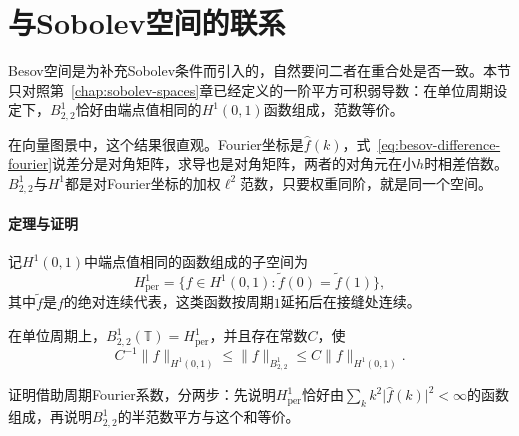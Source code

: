 \section{与Sobolev空间的联系}
\label{sec:besov-sobolev}

Besov空间是为补充Sobolev条件而引入的，自然要问二者在重合处是否一致。本节只对照第~\ref{chap:sobolev-spaces}章已经定义的一阶平方可积弱导数：在单位周期设定下，$B^1_{2,2}$恰好由端点值相同的$H^1(0,1)$函数组成，范数等价。

在向量图景中，这个结果很直观。Fourier坐标是$\widehat f(k)$，式~\eqref{eq:besov-difference-fourier}说差分是对角矩阵，求导也是对角矩阵，两者的对角元在小$h$时相差倍数。$B^1_{2,2}$与$H^1$都是对Fourier坐标的加权$\ell^2$范数，只要权重同阶，就是同一个空间。

\paragraph{定理与证明}
记$H^1(0,1)$中端点值相同的函数组成的子空间为
\[
 H^1_{\mathrm{per}}=\{f\in H^1(0,1):\tilde f(0)=\tilde f(1)\},
\]
其中$\tilde f$是$f$的绝对连续代表，这类函数按周期$1$延拓后在接缝处连续。

\begin{theorem}[$B^1_{2,2}$与周期$H^1$]
\label{thm:besov-b122-h1}
在单位周期上，$B^1_{2,2}(\mathbb T)=H^1_{\mathrm{per}}$，并且存在常数$C$，使
\begin{equation}
 C^{-1}\lVert f\rVert_{H^1(0,1)}\leq\lVert f\rVert_{B^1_{2,2}}\leq C\lVert f\rVert_{H^1(0,1)} .
 \label{eq:besov-b122-h1}
\end{equation}
\end{theorem}

证明借助周期Fourier系数，分两步：先说明$H^1_{\mathrm{per}}$恰好由$\sum_kk^2\lvert\widehat f(k)\rvert^2<\infty$的函数组成，再说明$B^1_{2,2}$的半范数平方与这个和等价。

